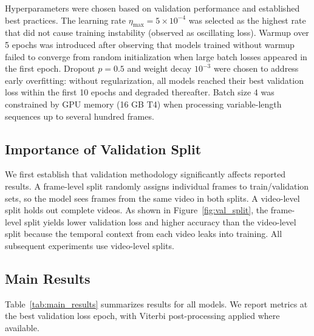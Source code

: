 \documentclass[10pt,twocolumn]{article}
\begin{document}
Hyperparameters were chosen based on validation performance and established best practices. The learning rate $\eta_\text{max} = 5 \times 10^{-4}$ was selected as the highest rate that did not cause training instability (observed as oscillating loss). Warmup over 5 epochs was introduced after observing that models trained without warmup failed to converge from random initialization when large batch losses appeared in the first epoch. Dropout $p = 0.5$ and weight decay $10^{-3}$ were chosen to address early overfitting: without regularization, all models reached their best validation loss within the first 10 epochs and degraded thereafter. Batch size 4 was constrained by GPU memory (16 GB T4) when processing variable-length sequences up to several hundred frames.

\subsection{Importance of Validation Split}

We first establish that validation methodology significantly affects reported results. A frame-level split randomly assigns individual frames to train/validation sets, so the model sees frames from the same video in both splits. A video-level split holds out complete videos. As shown in Figure~\ref{fig:val_split}, the frame-level split yields lower validation loss and higher accuracy than the video-level split because the temporal context from each video leaks into training. All subsequent experiments use video-level splits.

\subsection{Main Results}

Table~\ref{tab:main_results} summarizes results for all models. We report metrics at the best validation loss epoch, with Viterbi post-processing applied where available.
\end{document}
